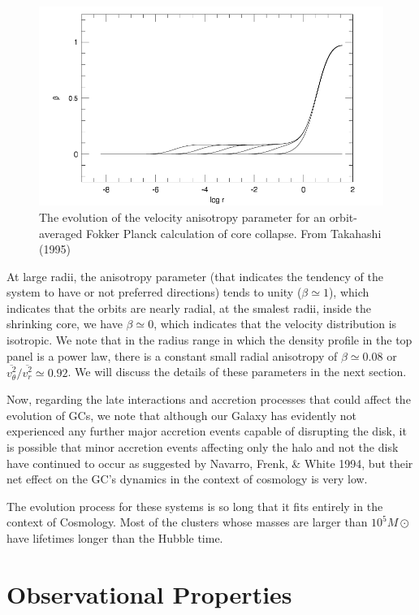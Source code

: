 \begin{figure}[H]
\centering
\includegraphics[width=12cm]{images/anisotropy_core_collapse.png}
\caption[Evolution of the velocity anisotropy parameter]{The evolution of the velocity anisotropy parameter for an orbit-averaged Fokker Planck calculation of core collapse. From Takahashi (1995)}
\end{figure}

At large radii, the anisotropy parameter (that indicates the tendency of the system to have or not preferred directions) tends to unity ($\beta\simeq1$), which indicates that the orbits are nearly radial, at the smalest radii, inside the shrinking core, we have $\beta\simeq0$, which indicates that the velocity distribution is isotropic. We note that in the radius range in which the density profile in the top panel is a power law, there is a constant small radial anisotropy of $\beta\simeq0.08$ or  $\overline{v_{\theta}^{2}}/\overline{v_{r}^{2}}\simeq0.92$. We will discuss the details of these parameters in the next section.

Now, regarding the late interactions and accretion processes that could affect the evolution of GCs, we note that although our Galaxy has evidently not experienced any further major accretion events capable of disrupting the disk, it is possible that minor accretion events affecting only the halo and not the disk have continued to occur as suggested by Navarro, Frenk, \& White 1994, but their net effect on the GC's dynamics in the context of cosmology is very low.

The evolution process for these systems is so long that it fits entirely in the context of Cosmology. Most of the clusters whose masses are larger than $10^{5}M\odot$ have lifetimes longer than the Hubble time.

\section{Observational Properties}

